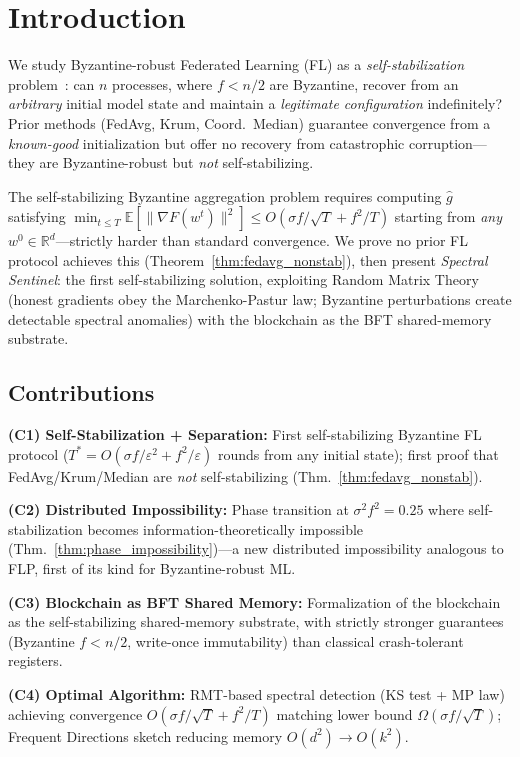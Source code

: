 \documentclass[runningheads]{llncs}
\begin{document}
\section{Introduction}

We study Byzantine-robust Federated Learning (FL) as a \emph{self-stabilization} problem~\cite{dijkstra_self_stab}: can $n$ processes, where $f < n/2$ are Byzantine, recover from an \emph{arbitrary} initial model state and maintain a \emph{legitimate configuration} indefinitely? Prior methods (FedAvg, Krum, Coord.\ Median) guarantee convergence from a \emph{known-good} initialization but offer no recovery from catastrophic corruption---they are Byzantine-robust but \emph{not} self-stabilizing.

The self-stabilizing Byzantine aggregation problem requires computing $\hat{g}$ satisfying $\min_{t \leq T}\mathbb{E}[\|\nabla F(w^t)\|^2] \leq O(\sigma f/\sqrt{T} + f^2/T)$ starting from \emph{any} $w^0 \in \mathbb{R}^d$---strictly harder than standard convergence. We prove no prior FL protocol achieves this (Theorem~\ref{thm:fedavg_nonstab}), then present \emph{Spectral Sentinel}: the first self-stabilizing solution, exploiting Random Matrix Theory (honest gradients obey the Marchenko-Pastur law; Byzantine perturbations create detectable spectral anomalies) with the blockchain as the BFT shared-memory substrate.

\subsection{Contributions}

\textbf{(C1) Self-Stabilization + Separation:} First self-stabilizing Byzantine FL protocol ($T^* = O(\sigma f/\varepsilon^2 + f^2/\varepsilon)$ rounds from any initial state); first proof that FedAvg/Krum/Median are \emph{not} self-stabilizing (Thm.~\ref{thm:fedavg_nonstab}).

\textbf{(C2) Distributed Impossibility:} Phase transition at $\sigma^2 f^2 = 0.25$ where self-stabilization becomes information-theoretically impossible (Thm.~\ref{thm:phase_impossibility})---a new distributed impossibility analogous to FLP, first of its kind for Byzantine-robust ML.

\textbf{(C3) Blockchain as BFT Shared Memory:} Formalization of the blockchain as the self-stabilizing shared-memory substrate, with strictly stronger guarantees (Byzantine $f<n/2$, write-once immutability) than classical crash-tolerant registers.

\textbf{(C4) Optimal Algorithm:} RMT-based spectral detection (KS test + MP law) achieving convergence $O(\sigma f/\sqrt{T} + f^2/T)$ matching lower bound $\Omega(\sigma f/\sqrt{T})$; Frequent Directions sketch reducing memory $O(d^2) \to O(k^2)$.
\end{document}
